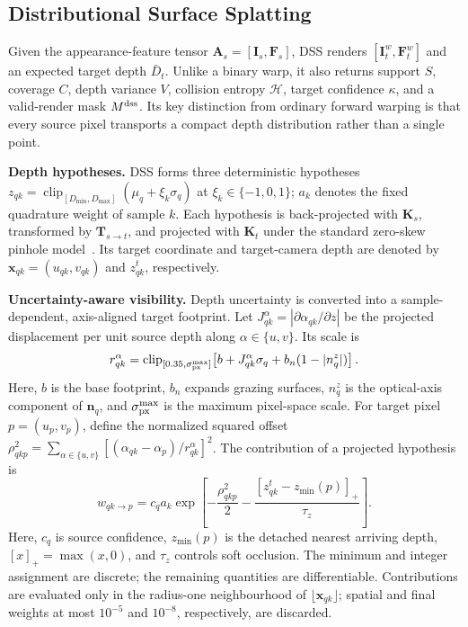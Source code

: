 \documentclass[letterpaper,10pt,conference]{ieeeconf}
\newcommand{\I}{\mathbf{I}}
\newcommand{\K}{\mathbf{K}}
\newcommand{\T}{\mathbf{T}}
\newcommand{\F}{\mathbf{F}}
\newcommand{\n}{\mathbf{n}}
\begin{document}
\subsection{Distributional Surface Splatting}

Given the appearance-feature tensor $\mathbf A_s=[\I_s,\F_s]$, DSS renders
$[\I_t^w,\F_t^w]$ and an expected target depth $\bar D_t$. Unlike a binary
warp, it also returns support $S$, coverage $C$, depth variance $V$, collision
entropy $\mathcal H$, target confidence $\kappa$, and a valid-render mask
$M^{\rm dss}$. Its key distinction from ordinary forward warping is that every
source pixel transports a compact depth distribution rather than a single
point.

\noindent\textbf{Depth hypotheses.}
DSS forms three deterministic hypotheses
$z_{qk}=\operatorname{clip}_{[D_{\min},D_{\max}]}
(\mu_q+\xi_k\sigma_q)$ at $\xi_k\in\{-1,0,1\}$; $a_k$ denotes the fixed
quadrature weight of sample $k$. Each hypothesis is back-projected with
$\K_s$, transformed by $\T_{s\rightarrow t}$, and projected with $\K_t$
under the standard zero-skew pinhole model~\cite{wiles2020synsin,niklaus2020softmax}.
Its target coordinate and target-camera depth are denoted by
$\mathbf x_{qk}=(u_{qk},v_{qk})$ and $z^t_{qk}$, respectively.

\noindent\textbf{Uncertainty-aware visibility.}
Depth uncertainty is converted into a sample-dependent, axis-aligned target
footprint. Let $J^\alpha_{qk}=|\partial\alpha_{qk}/\partial z|$ be the
projected displacement per unit source depth along $\alpha\in\{u,v\}$. Its
scale is
\begin{equation}
 r^\alpha_{qk}=
 \operatorname{clip}_{[0.35,\sigma_{\rm px}^{\max}]}\!\left[
 b+J^\alpha_{qk}\sigma_q+b_n(1-|n_q^z|)\right].
\label{eq:dss-footprint}
\end{equation}
Here, $b$ is the base footprint, $b_n$ expands grazing surfaces, $n_q^z$ is
the optical-axis component of $\n_q$, and $\sigma_{\rm px}^{\max}$ is the
maximum pixel-space scale. For target pixel $p=(u_p,v_p)$, define the
normalized squared offset
$\rho_{qkp}^2=\sum_{\alpha\in\{u,v\}}
[(\alpha_{qk}-\alpha_p)/r^\alpha_{qk}]^2$. The contribution of a projected
hypothesis is
\begin{equation}
 w_{qk\rightarrow p}=c_q a_k\exp\!\left[
 -\frac{\rho_{qkp}^2}{2}
 -\frac{[z^t_{qk}-z_{\min}(p)]_+}{\tau_z}\right].
\label{eq:dss-weight}
\end{equation}
Here, $c_q$ is source confidence, $z_{\min}(p)$ is the detached nearest
arriving depth, $[x]_+=\max(x,0)$, and $\tau_z$ controls soft occlusion. The
minimum and integer assignment are discrete; the remaining quantities are
differentiable. Contributions are evaluated only in the radius-one
neighbourhood of $\lfloor\mathbf x_{qk}\rfloor$; spatial and final weights at
most $10^{-5}$ and $10^{-8}$, respectively, are discarded.
\end{document}
